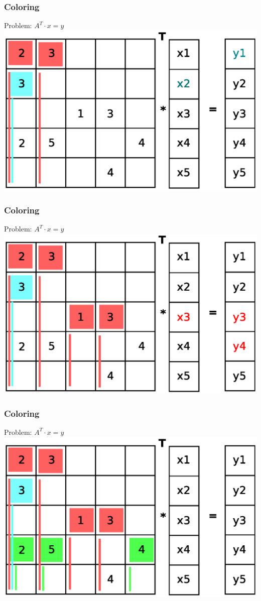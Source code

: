\documentclass{beamer}
\begin{document}
\begin{frame}
\frametitle{Coloring}
Problem: $A^T \cdot x= y$
\includegraphics[width=0.8\linewidth]{graphic/coloringT7.eps}
\end{frame}

\begin{frame}
\frametitle{Coloring}
Problem: $A^T \cdot x= y$
\includegraphics[width=0.8\linewidth]{graphic/coloringT8.eps}
\end{frame}

\begin{frame}
\frametitle{Coloring}
Problem: $A^T \cdot x= y$
\includegraphics[width=0.8\linewidth]{graphic/coloringT9.eps}
\end{frame}
\end{document}
